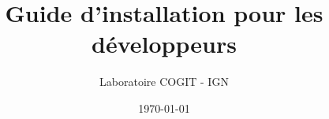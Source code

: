 \documentclass[a4paper,11pt]{report}
\begin{document}

\title{Guide d'installation pour les développeurs}
\author{Laboratoire COGIT - IGN}
\date{\today}



\maketitle



\tableofcontents





\end{document}
